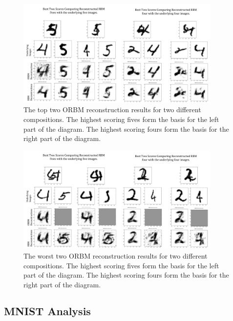 \begin{figure}[htb]
  \begin{center}
    \includegraphics[width=0.9\textwidth]{Assets/results/orbm-Best-2-results.png}
  \end{center}
  \caption{The top two ORBM reconstruction results for two different compositions. The highest scoring fives form the basis for the left part of the diagram. The highest scoring fours form the basis for the right part of the diagram.}
  \label{F:Best-Results-MNIST}
\end{figure}

\begin{figure}[htb]
  \begin{center}
    \includegraphics[width=0.9\textwidth]{Assets/results/orbm-Worst-2-results.png}
  \end{center}
  \caption{The worst two ORBM reconstruction results for two different compositions. The highest scoring fives form the basis for the left part of the diagram. The highest scoring fours form the basis for the right part of the diagram.}
  \label{F:Worst-Results-MNIST}
\end{figure}


\subsection{MNIST Analysis}

